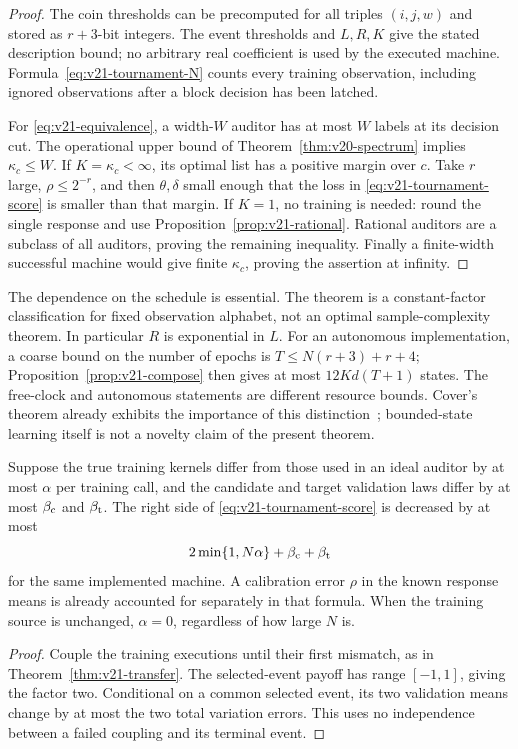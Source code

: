 \begin{proof}
The coin thresholds can be precomputed for all triples $(i,j,w)$ and
stored as $r+3$-bit integers. The event thresholds and $L,R,K$ give the
stated description bound; no arbitrary real coefficient is used by the
executed machine. Formula~\eqref{eq:v21-tournament-N} counts every
training observation, including ignored observations after a block
decision has been latched.

For \eqref{eq:v21-equivalence}, a width-$W$ auditor has at most $W$
labels at its decision cut. The operational upper bound of
Theorem~\ref{thm:v20-spectrum} implies $\kappa_c\le W$. If
$K=\kappa_c<\infty$, its optimal list has a positive margin over $c$.
Take $r$ large, $\rho\le2^{-r}$, and then $\theta,\delta$ small enough
that the loss in \eqref{eq:v21-tournament-score} is smaller than that
margin. If $K=1$, no training is needed: round the single response and
use Proposition~\ref{prop:v21-rational}. Rational auditors are a
subclass of all auditors, proving the remaining inequality. Finally a
finite-width successful machine would give finite $\kappa_c$, proving
the assertion at infinity.
\end{proof}

The dependence on the schedule is essential. The theorem is a
constant-factor classification for fixed observation alphabet, not an
optimal sample-complexity theorem. In particular $R$ is exponential in
$L$. For an autonomous implementation, a coarse bound on the number
of epochs is $T\le N(r+3)+r+4$; Proposition~\ref{prop:v21-compose}
then gives at most $12Kd(T+1)$ states. The free-clock and autonomous
statements are different resource bounds. Cover's theorem already
exhibits the importance of this distinction~\cite[Theorem 2 and
Section 4]{Cover1969}; bounded-state learning itself is not a novelty
claim of the present theorem.

\begin{corollary}
\label{cor:v21-calibrated}
Suppose the true training kernels differ from those used in an ideal
auditor by at most $\alpha$ per training call, and the candidate and
target validation laws differ by at most $\beta_{\rm c}$ and
$\beta_{\rm t}$. The right side of
\eqref{eq:v21-tournament-score} is decreased by at most
\[
 2\min\{1,N\alpha\}+\beta_{\rm c}+\beta_{\rm t}
\]
for the same implemented machine. A calibration error $\rho$ in the
known response means is already accounted for separately in that
formula. When the training source is unchanged, $\alpha=0$, regardless
of how large $N$ is.
\end{corollary}
\begin{proof}
Couple the training executions until their first mismatch, as in
Theorem~\ref{thm:v21-transfer}. The selected-event payoff has range
$[-1,1]$, giving the factor two. Conditional on a common selected event,
its two validation means change by at most the two total variation
errors. This uses no independence between a failed coupling and its
terminal event.
\end{proof}
